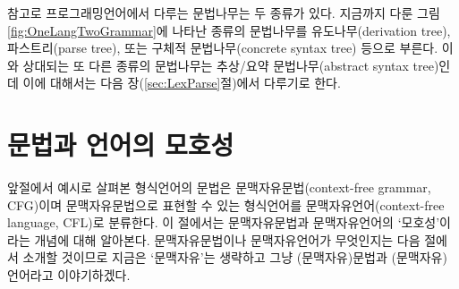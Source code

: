 참고로 프로그래밍언어에서 다루는 문법나무는 두 종류가 있다.
지금까지 다룬 그림\;\ref{fig:OneLangTwoGrammar}에 나타난 종류의 문법나무를
유도나무(derivation tree), 파스트리(parse tree), 또는
구체적 문법나무(concrete syntax tree) 등으로 부른다.
이와 상대되는 또 다른 종류의 문법나무는
추상/요약 문법나무(abstract syntax tree)인데
이에 대해서는 다음 장(\ref{sec:LexParse}절)에서 다루기로 한다.

\section{문법과 언어의 모호성}
\label{sec:ambiguous}
앞절에서 예시로 살펴본 형식언어의 문법은 문맥자유문법(context-free grammar, CFG)이며
문맥자유문법으로 표현할 수 있는 형식언어를 문맥자유언어(context-free language, CFL)로
분류한다. 이 절에서는 문맥자유문법과 문맥자유언어의 `모호성'이라는 개념에 대해 알아본다.
문맥자유문법이나 문맥자유언어가 무엇인지는 다음 절에서 소개할 것이므로
지금은 `문맥자유'는 생략하고 그냥 (문맥자유)문법과 (문맥자유)언어라고 이야기하겠다.

